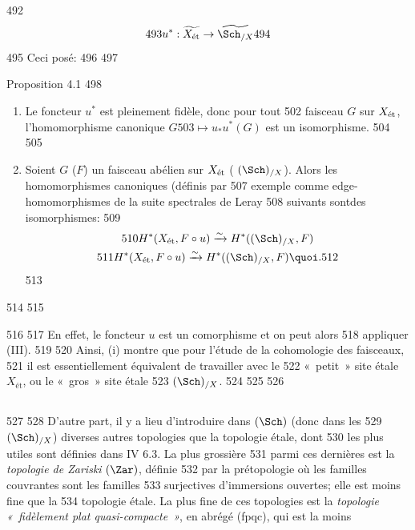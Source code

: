    492	$$
   493	u^{\ast} : \widetilde{X_{\text{ét}}} \to \widetilde{\Sch_{/X}}
   494	$$
   495	Ceci posé:
   496	
   497	\begin{enonce*}{Proposition 4.1}
   498	\begin{enumerate}
   499	\renewcommand{\theenumi}{\roman{enumi}}
   500	\renewcommand{\labelenumi}{(\theenumi)}
   501	\item Le foncteur $u^{\ast}$ est pleinement fidèle, donc pour tout
   502	faisceau $G$ sur $X_{\text{\rm ét}}$, l'homomorphisme canonique $G
   503	\mapsto u_{\ast} u^{\ast} (G)$ est un isomorphisme.
   504	
   505	\item Soient $G$ (\resp $F$) un faisceau abélien sur $X_{\text{\rm ét}}$ (	$(\Sch)_{/X}$). Alors les homomorphismes canoniques (définis par
   507	exemple comme edge-homomorphismes de la suite spectrales de Leray
   508	suivants sont\pageoriginale des isomorphismes:
   509	\begin{gather*}
   510	H^{\ast} (X_{\text{\rm ét}}, F \circ u) \xrightarrow{\sim} H^{\ast}((\Sch)_{/X}, F)\\
   511	H^{\ast} (X_{\text{\rm ét}}, F \circ u) \xrightarrow{\sim} H^{\ast}((\Sch)_{/X}, F){\quoi}.
   512	\end{gather*}
   513	\end{enumerate}
   514	
   515	\end{enonce*}
   516	
   517	En effet, le foncteur $u$ est un comorphisme et on peut alors
   518	appliquer (III).
   519	
   520	Ainsi, (i) montre que pour l'étude de la cohomologie des faisceaux,
   521	il est essentiellement équivalent de travailler avec le
   522	« petit » site étale $X_{\text{ét}}$, ou le « gros » site étale
   523	$(\Sch)_{/X}$.
   524	
   525	\setcounter{subsection}{1}
   526	\subsection{}
   527	
   528	D'autre part, il y a lieu d'introduire dans $(\Sch)$ (donc dans les
   529	$(\Sch)_{/X}$) diverses autres topologies que la topologie étale, dont
   530	les plus utiles sont définies dans  IV 6.3. La plus grossière
   531	parmi ces dernières est la \emph{topologie de Zariski} $(\Zar)$, définie
   532	par la prétopologie où les familles couvrantes sont les familles
   533	surjectives d'immersions ouvertes; elle est moins fine que la
   534	topologie étale. La plus fine de ces topologies est la \emph{topologie « fidèlement plat quasi-compacte »}, en abrégé (fpqc), qui est la moins
